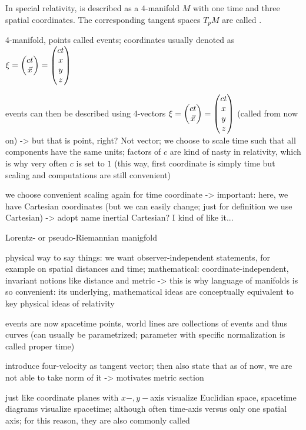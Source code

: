 \begin{defi}
	In special relativity,  is described as a $4$-manifold $M$ with one time and three spatial coordinates. The corresponding tangent spaces $T_p M$ are called .
	
	
	
	4-manifold, points called events; coordinates usually denoted as $\mathbf{\xi} = \mqty(c t \\ \vec{x}) = \mqty(c t \\ x \\ y \\ z)$
	
	events can then be described using 4-vectors $\mathbf{\xi} = \mqty(c t \\ \vec{x}) = \mqty(c t \\ x \\ y \\ z)$ (called  from now on) -> but that is point, right? Not vector; we choose to scale time such that all components have the same units; factors of $c$ are kind of nasty in relativity, which is why very often $c$ is set to $1$ (this way, first coordinate is simply time but scaling and computations are still convenient)
\end{defi}
we choose convenient scaling again for time coordinate -> important: here, we have Cartesian coordinates (but we can easily change; just for definition we use Cartesian) -> adopt name inertial Cartesian? I kind of like it...

Lorentz- or pseudo-Riemannian manigfold



physical way to say things: we want observer-independent statements, for example on spatial distances and time; mathematical: coordinate-independent, invariant notions like distance and metric -> this is why language of manifolds is so convenient: its underlying, mathematical ideas are conceptually equivalent to key physical ideas of relativity



events are now spacetime points, world lines are collections of events and thus curves (can usually be parametrized; parameter with specific normalization is called proper time)


introduce four-velocity as tangent vector; then also state that as of now, we are not able to take norm of it -> motivates metric section



just like coordinate planes with $x-, y-$axis visualize Euclidian space, spacetime diagrams visualize spacetime; although often time-axis versus only one spatial axis; for this reason, they are also commonly called 







